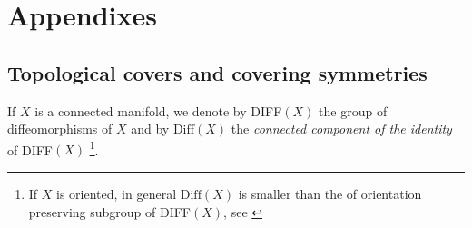 \documentclass[11pt]{article}
\newtheorem{proposition}[theorem]{Proposition}
\def\N{{\cal N}}
\def\R{{\cal R}}
\def\f{{\varphi}}
\def\Diff{{\rm Diff}}
\def\Diff{{\mathrm {Diff}}}
\def\N{{\mathcal N}}
\def\R{{\mathcal R}}
\begin{document}


\appendix
%
\section{Appendixes}
%
\subsection{Topological covers and covering symmetries}
\label{top}
If $X$ is a connected manifold, we denote by DIFF$(X)$ the group of 
diffeomorphisms of $X$ and by $\Diff(X)$ the 
\emph{connected component of the identity} of DIFF$(X)$
\footnote{If $X$ is oriented, in general  $\Diff(X)$ is smaller than 
the of orientation preserving subgroup of DIFF$(X)$, see \cite{M}}.
\end{document}
